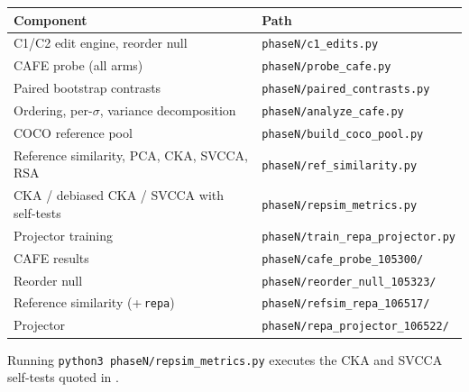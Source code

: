 \documentclass[10pt]{article}
\newcommand{\method}{\textsf{CAFE}\xspace}
\begin{document}
\begin{table}[h]
\centering
\small
\begin{tabularx}{\textwidth}{@{}lX@{}}
\toprule
Component & Path \\
\midrule
C1/C2 edit engine, reorder null & \texttt{phaseN/c1\_edits.py} \\
\method probe (all arms) & \texttt{phaseN/probe\_cafe.py} \\
Paired bootstrap contrasts & \texttt{phaseN/paired\_contrasts.py} \\
Ordering, per-$\sigma$, variance decomposition & \texttt{phaseN/analyze\_cafe.py} \\
COCO reference pool & \texttt{phaseN/build\_coco\_pool.py} \\
Reference similarity, PCA, CKA, SVCCA, RSA & \texttt{phaseN/ref\_similarity.py} \\
CKA / debiased CKA / SVCCA with self-tests & \texttt{phaseN/repsim\_metrics.py} \\
Projector training & \texttt{phaseN/train\_repa\_projector.py} \\
\midrule
\method results & \texttt{phaseN/cafe\_probe\_105300/} \\
Reorder null & \texttt{phaseN/reorder\_null\_105323/} \\
Reference similarity (+\,\texttt{repa}) & \texttt{phaseN/refsim\_repa\_106517/} \\
Projector & \texttt{phaseN/repa\_projector\_106522/} \\
\bottomrule
\end{tabularx}
\end{table}

Running \texttt{python3 phaseN/repsim\_metrics.py} executes the CKA and SVCCA self-tests quoted in
.
\end{document}
